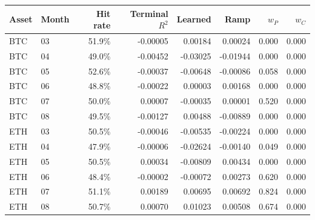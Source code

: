 \begin{tabular}{llrrrrrr}
\toprule
Asset & Month & Hit rate & Terminal $R^2$ & Learned & Ramp & $w_P$ & $w_C$ \\
\midrule
BTC & 03 & 51.9\% & -0.00005 & 0.00184 & 0.00024 & 0.000 & 0.000 \\
BTC & 04 & 49.0\% & -0.00452 & -0.03025 & -0.01944 & 0.000 & 0.000 \\
BTC & 05 & 52.6\% & -0.00037 & -0.00648 & -0.00086 & 0.058 & 0.000 \\
BTC & 06 & 48.8\% & -0.00022 & 0.00003 & 0.00168 & 0.000 & 0.000 \\
BTC & 07 & 50.0\% & 0.00007 & -0.00035 & 0.00001 & 0.520 & 0.000 \\
BTC & 08 & 49.5\% & -0.00127 & 0.00488 & -0.00889 & 0.000 & 0.000 \\
ETH & 03 & 50.5\% & -0.00046 & -0.00535 & -0.00224 & 0.000 & 0.000 \\
ETH & 04 & 47.9\% & -0.00006 & -0.02624 & -0.00140 & 0.049 & 0.000 \\
ETH & 05 & 50.5\% & 0.00034 & -0.00809 & 0.00434 & 0.000 & 0.000 \\
ETH & 06 & 48.4\% & -0.00002 & -0.00072 & 0.00273 & 0.620 & 0.000 \\
ETH & 07 & 51.1\% & 0.00189 & 0.00695 & 0.00692 & 0.824 & 0.000 \\
ETH & 08 & 50.7\% & 0.00070 & 0.01023 & 0.00508 & 0.674 & 0.000 \\
\bottomrule
\end{tabular}
